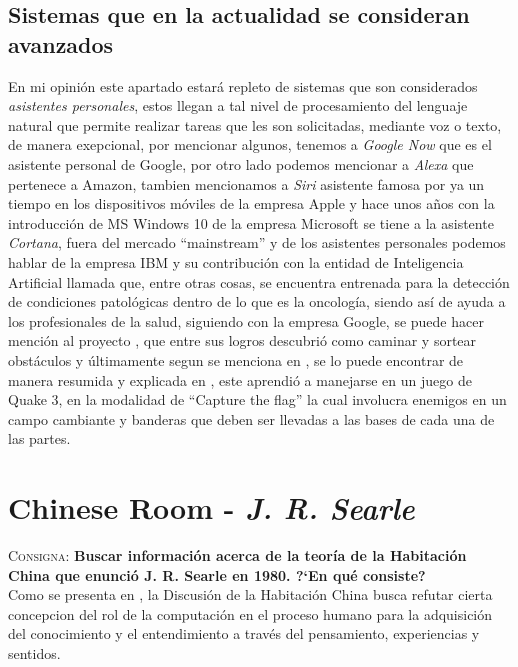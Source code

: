 \documentclass{article}
\begin{document}
\subsection{Sistemas que en la actualidad se consideran avanzados}
En mi opini\'on este apartado estar\'a repleto de sistemas que son considerados \textit{asistentes personales}, estos llegan a tal nivel de procesamiento del lenguaje natural que permite realizar tareas que les son solicitadas, mediante voz o texto, de manera exepcional, por mencionar algunos, tenemos a \textit{Google Now} que es el asistente personal de Google, por otro lado podemos mencionar a \textit{Alexa} que pertenece a Amazon, tambien mencionamos a \textit{Siri} asistente famosa por ya un tiempo en los dispositivos m\'oviles de la empresa Apple y hace unos a\~nos con la introducci\'on de MS Windows 10 de la empresa Microsoft se tiene a la asistente \textit{Cortana}, fuera del mercado ``mainstream'' y de los asistentes personales podemos hablar de la empresa IBM y su contribuci\'on con la entidad de Inteligencia Artificial llamada \cite{watson} que, entre otras cosas,  se encuentra entrenada para la detecci\'on de condiciones patol\'ogicas dentro de lo que es la oncolog\'ia\cite{watsononcologia},  siendo as\'i de ayuda a los profesionales de la salud, siguiendo con la empresa Google, se puede hacer menci\'on al proyecto \cite{deepmind}, que entre sus logros descubri\'o como caminar y sortear obst\'aculos \cite{tideepmind} y \'ultimamente segun se menciona en \cite{deepmindquake}, se lo puede encontrar de manera resumida y explicada en \cite{deepmindquakeresumen}, este aprendi\'o a manejarse en un juego de Quake 3, en la modalidad de ``Capture the flag'' la cual involucra enemigos en un campo cambiante y banderas que deben ser llevadas a las bases de cada una de las partes.

\section{Chinese Room - \textit{J. R. Searle}}
\textsc{Consigna}: \textbf{Buscar informaci\'on acerca de la teor\'ia de la Habitaci\'on China que enunci\'o J. R. Searle en 1980. ?`En qu\'e consiste?}\\

Como se presenta en \cite{searle2009}, la Discusi\'on de la Habitación China busca refutar cierta concepcion del rol de la computaci\'on en el proceso humano para la adquisici\'on del conocimiento y el entendimiento a trav\'es del pensamiento, experiencias y sentidos.
\end{document}
